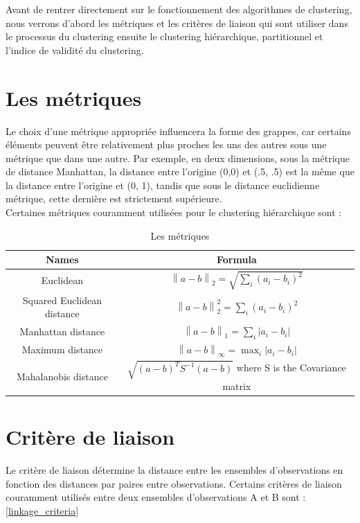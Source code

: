 Avant de rentrer directement sur le fonctionnement des algorithmes de clustering, nous verrons d’abord les métriques et les critères de liaison qui sont utiliser dans le processus du clustering ensuite le clustering hiérarchique, partitionnel et l’indice de validité du clustering.
\section{Les métriques}
Le choix d'une métrique appropriée influencera la forme des grappes, car certains éléments peuvent être relativement plus proches les uns des autres sous une métrique que dans une autre.
Par exemple, en deux dimensions, sous la métrique de distance Manhattan, la distance entre l'origine (0,0) et (.5, .5) est la même que la distance entre l'origine et (0, 1), tandis que sous le distance euclidienne métrique, cette dernière est strictement supérieure. \\
Certaines métriques couramment utilisées pour le clustering hiérarchique sont :

\begin{table}[!htbp]
    \centering
	\begin{tabular}{|c| c|}
	\hline
	\rowcolor{blueforest}
	\color{white} \textbf{Names} & \color{white} \textbf{Formula}  \\ \hline
	Euclidean  & \(\displaystyle \left\lVert a - b\right\rVert_{2} = \sqrt{\sum_{i}^{} (a_{i} - b_{i})^{2} } \)   \\  \hline
	Squared Euclidean distance  & \(\displaystyle \left\lVert a - b\right\rVert_{2}^{2} = \sum_{i}^{} (a_{i} - b_{i})^{2} \)   \\  \hline
	Manhattan distance  & \(\displaystyle \left\lVert a - b\right\rVert_{1} = \sum_{i}^{} \left\lvert a_{i} - b_{i} \right\rvert \)   \\  \hline
	Maximum distance  & \(\displaystyle \left\lVert a - b\right\rVert_{\infty} = \max_{i} \left\lvert a_{i} - b_{i} \right\rvert  \)   \\  \hline
	Mahalanobis distance  & \(\displaystyle \sqrt{(a-b)^{T}S^{-1}(a-b)} \) where S is the Covariance matrix   \\  \hline
	\end{tabular}
	\caption{Les métriques }
	\label{metrics}
\end{table}

\section{Critère de liaison}
Le critère de liaison détermine la distance entre les ensembles d'observations en fonction des distances par paires entre observations. Certains critères de liaison couramment utilisés entre deux ensembles d’observations A et B sont : \ref{linkage_criteria}

